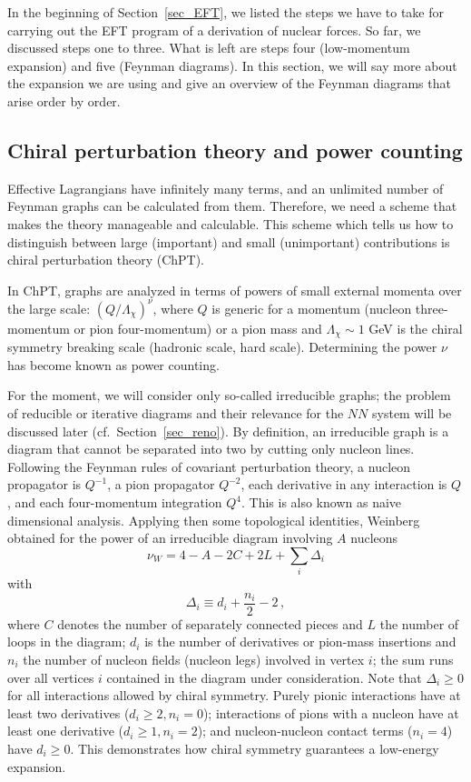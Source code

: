 \documentclass[sort&compress,preprint,3p]{elsarticle}
\begin{document}
In the beginning of Section~\ref{sec_EFT},
we listed the steps we have to take for carrying out
the EFT program of a derivation of nuclear forces.
So far, we discussed steps one to three.
What is left are steps four (low-momentum expansion) and
five (Feynman diagrams).
In this section, we will say more about the expansion
we are using and
give an overview of the Feynman diagrams that arise
order by order.

\subsection{Chiral perturbation theory and power counting
\label{sec_chpt}}

Effective Lagrangians have infinitely
many terms, and an unlimited number of Feynman graphs can be calculated
from them. Therefore, 
we need a scheme that makes the theory manageable and calculable.
This scheme
which tells us how to distinguish between large
(important) and small (unimportant) contributions
is chiral perturbation theory (ChPT).

In ChPT, 
graphs are analyzed
in terms of powers of small external momenta over the large scale:
$(Q/\Lambda_\chi)^\nu$,
where $Q$ is generic for a momentum (nucleon three-momentum or
pion four-momentum) or a pion mass and $\Lambda_\chi \sim 1$ GeV
is the chiral symmetry breaking scale (hadronic scale, hard scale).
Determining the power $\nu$ 
has become known as power counting.

For the moment, we will consider only so-called irreducible
graphs; the problem of reducible or iterative
diagrams and their relevance for the $NN$ system
will be discussed later (cf.\ Section~\ref{sec_reno}).
By definition, an irreducible graph is a diagram that
cannot be separated into two
by cutting only nucleon lines.
Following the Feynman rules of covariant perturbation theory,
a nucleon propagator is $Q^{-1}$,
a pion propagator $Q^{-2}$,
each derivative in any interaction is $Q$,
and each four-momentum integration $Q^4$.
This is also known as naive dimensional analysis.
Applying then some topological identities, Weinberg obtained
for the power of an irreducible diagram
involving $A$ nucleons~\cite{Wei90,Wei91,Wei92}
\begin{equation}
\nu_W = 4 - A - 2C + 2L + \sum_i \Delta_i 
\label{eq_nuw}
\end{equation}
with
\begin{equation}
\Delta_i  \equiv   d_i + \frac{n_i}{2} - 2  \, ,
\label{eq_Deltai}
\end{equation}
where $C$ denotes the number of separately connected pieces and
$L$ the number of loops in the diagram;
$d_i$ is the number of derivatives or pion-mass insertions 
and $n_i$ the number of nucleon fields (nucleon legs)
involved in vertex $i$;
the sum runs over all vertices $i$ contained in the diagram 
under consideration.
Note that $\Delta_i \geq 0$
for all interactions allowed by chiral symmetry.
Purely pionic interactions have at least two derivatives
($d_i\geq 2, n_i=0$);
interactions of pions with a nucleon have at least one
derivative
($d_i\geq 1, n_i=2$);
and nucleon-nucleon contact terms ($n_i=4$)
have $d_i\geq0$.
This demonstrates how chiral symmetry
guarantees a low-energy expansion.
\end{document}

